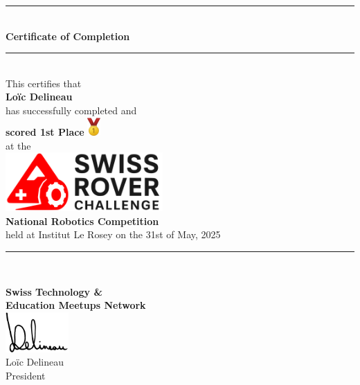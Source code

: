 \documentclass[10pt]{article}
\begin{document}
\begin{center}
	\rule{10cm}{0.4pt} \\
	\vspace{1cm}
	{\LARGE \bfseries Certificate of Completion} \\
	\vspace{0.5cm}
	\rule{10cm}{0.4pt} \\
	\vspace{1.5cm}
	{\large This certifies that} \\
	\vspace{1cm}
	{\Huge \bfseries Loïc Delineau} \\
	\vspace{1cm}
	{\large has successfully completed and} \\
	\vspace{0.8cm}
	{\LARGE \bfseries scored 1st Place }
	\includegraphics[width=0.5cm]{gold.png} \\
	\vspace{1cm}
	{\large at the} \\
	\vspace{1cm}
	\includegraphics[width=6cm]{src.png} \\
	\vspace{1cm}
	{\LARGE \bfseries National Robotics Competition} \\
	\vspace{1cm}
	{\large held at Institut Le Rosey on the 31st of May, 2025} \\
	\vspace{1cm}
	\rule{10cm}{0.4pt} \\
\end{center}

\begin{flushright}
\end{flushright}

\vfill

\begin{center}
	\textbf{Swiss Technology \&} \\
	\textbf{Education Meetups Network} \\
	\vspace{0.3cm}
	\includegraphics[width=2.4cm]{signature-tight.png} \\
	Loïc Delineau \\
	President \\
\end{center}
\end{document}
